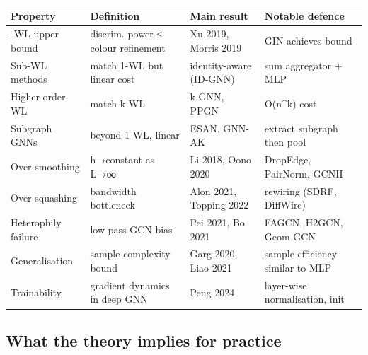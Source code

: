 {\def\LTcaptype{none} %
\begin{longtable}[]{@{}
  >{\raggedright\arraybackslash}p{}
  >{\raggedright\arraybackslash}p{}
  >{\raggedright\arraybackslash}p{}
  >{\raggedright\arraybackslash}p{}@{}}
\toprule\noalign{}
\begin{minipage}[b]{\linewidth}\raggedright
Property
\end{minipage} & \begin{minipage}[b]{\linewidth}\raggedright
Definition
\end{minipage} & \begin{minipage}[b]{\linewidth}\raggedright
Main result
\end{minipage} & \begin{minipage}[b]{\linewidth}\raggedright
Notable defence
\end{minipage} \\
\midrule\noalign{}
\endhead
\bottomrule\noalign{}
\endlastfoot
1-WL upper bound & discrim. power ≤ colour refinement & Xu 2019, Morris 2019 & GIN achieves bound \\
Sub-WL methods & match 1-WL but linear cost & identity-aware (ID-GNN) & sum aggregator + MLP \\
Higher-order WL & match k-WL & k-GNN, PPGN & O(n\^{}k) cost \\
Subgraph GNNs & beyond 1-WL, linear & ESAN, GNN-AK & extract subgraph then pool \\
Over-smoothing & h→constant as L→∞ & Li 2018, Oono 2020 & DropEdge, PairNorm, GCNII \\
Over-squashing & bandwidth bottleneck & Alon 2021, Topping 2022 & rewiring (SDRF, DiffWire) \\
Heterophily failure & low-pass GCN bias & Pei 2021, Bo 2021 & FAGCN, H2GCN, Geom-GCN \\
Generalisation & sample-complexity bound & Garg 2020, Liao 2021 & sample efficiency similar to MLP \\
Trainability & gradient dynamics in deep GNN & Peng 2024 & layer-wise normalisation, init \\
\end{longtable}
}

\subsection{What the theory implies for practice}\label{what-the-theory-implies-for-practice}

